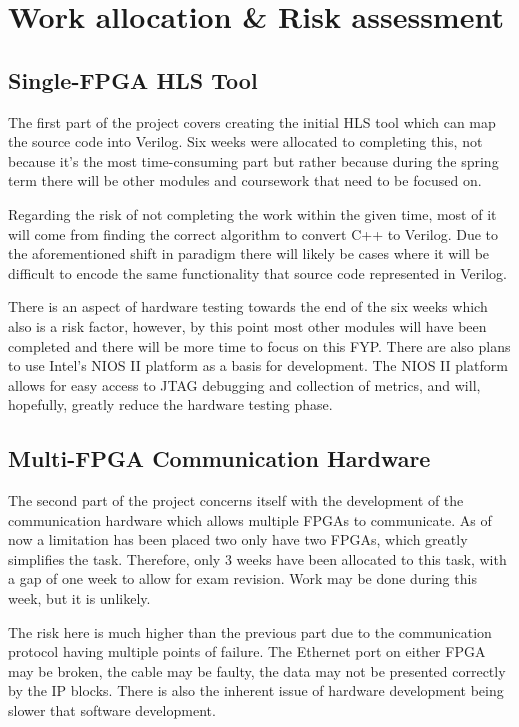 \section{Work allocation \& Risk assessment}
\subsection{Single-FPGA HLS Tool}

The first part of the project covers creating the initial HLS tool which can map the source code into Verilog. Six weeks were allocated to completing this, not because it's the most time-consuming part but rather because during the spring term there will be other modules and coursework that need to be focused on.

Regarding the risk of not completing the work within the given time, most of it will come from finding the correct algorithm to convert C++ to Verilog. Due to the aforementioned shift in paradigm there will likely be cases where it will be difficult to encode the same functionality that source code represented in Verilog.

There is an aspect of hardware testing towards the end of the six weeks which also is a risk factor, however, by this point most other modules will have been completed and there will be more time to focus on this FYP. There are also plans to use Intel's NIOS II platform as a basis for development. The NIOS II platform allows for easy access to JTAG debugging and  collection of metrics, and will, hopefully, greatly reduce the hardware testing phase.

\subsection{Multi-FPGA Communication Hardware}

The second part of the project concerns itself with the development of the communication hardware which allows multiple FPGAs to communicate. As of now a limitation has been placed two only have two FPGAs, which greatly simplifies the task. Therefore, only 3 weeks have been allocated to this task, with a gap of one week to allow for exam revision. Work may be done during this week, but it is unlikely.

The risk here is much higher than the previous part due to the communication protocol having multiple points of failure. The Ethernet port on either FPGA may be broken, the cable may be faulty, the data may not be presented correctly by the IP blocks. There is also the inherent issue of hardware development being slower that software development. 

